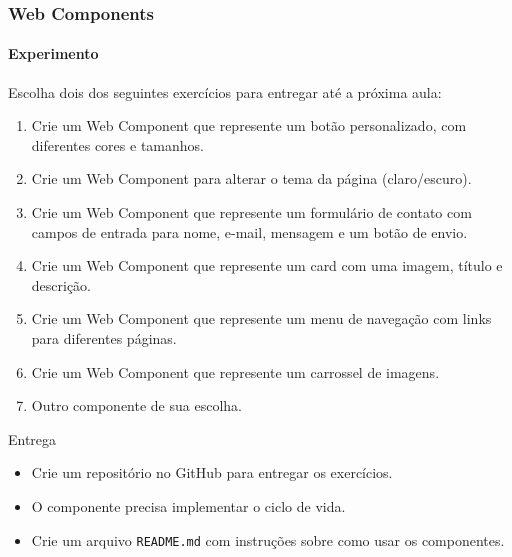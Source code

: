 \documentclass[
	9pt, %
	t, %
]{beamer}
\begin{document}
\begin{frame}
	\frametitle{Web Components}
	\framesubtitle{Experimento}

	Escolha dois dos seguintes exercícios para entregar até a próxima aula:

	\begin{enumerate}
		\item Crie um Web Component que represente um botão personalizado, com diferentes cores e tamanhos.
		\item Crie um Web Component para alterar o tema da página (claro/escuro).
		\item Crie um Web Component que represente um formulário de contato com campos de entrada para nome, e-mail, mensagem e um botão de envio.
		\item Crie um Web Component que represente um card com uma imagem, título e descrição.
		\item Crie um Web Component que represente um menu de navegação com links para diferentes páginas.
		\item Crie um Web Component que represente um carrossel de imagens.
		\item Outro componente de sua escolha.
	\end{enumerate}

	\begin{block}{Entrega}
		\begin{itemize}
			\item Crie um repositório no GitHub para entregar os exercícios.
			\item O componente precisa implementar o ciclo de vida.
			\item Crie um arquivo \texttt{README.md} com instruções sobre como usar os componentes.
		\end{itemize}
	\end{block}

\end{frame}
\end{document}

